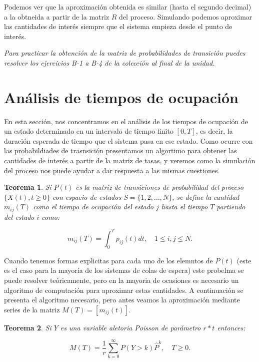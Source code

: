 \documentclass[
]{book}
\newtheorem{theorem}{Teorema}[chapter]
\theoremstyle{definition}
\theoremstyle{definition}
\theoremstyle{definition}
\theoremstyle{definition}
\theoremstyle{remark}
\begin{document}
Podemos ver que la aproximación obtenida es similar (hasta el segundo decimal) a la obtneida a partir de la matriz \(R\) del proceso. Simulando podemos aproximar las cantidades de interés siempre que el sistema empieza desde el punto de interés.

\emph{Para practicar la obtención de la matriz de probabilidades de transición puedes resolver los ejercicios B-1 a B-4 de la colección al final de la unidad.}

\hypertarget{CMTCG}{%
\section{Análisis de tiempos de ocupación}\label{CMTCG}}

En esta sección, nos concentramos en el análisis de los tiempos de ocupación de un estado determinado en un intervalo de tiempo finito \([0, T]\), es decir, la duración esperada de tiempo que el sistema pasa en ese estado. Como ocurre con las probabildiades de trasnsición presentamos un algortimo para obtener las cantidades de interés a partir de la matriz de tasas, y veremos como la simulación del proceso nos puede ayudar a dar respuesta a las mismas cuestiones.

\begin{theorem}
Si \(P(t)\) es la matriz de transiciones de probabilidad del proceso \(\{X(t), t \geq 0\}\) con espacio de estados \(S = \{1, 2,...,N\}\), se define la cantidad \(m_{ij}(T)\) como el tiempo de ocupación del estado \(j\) hasta el tiempo \(T\) partiendo del estado \(i\) como:

\[m_{ij}(T) = \int_0^T p_{ij}(t)dt, \quad 1 \leq i, j \leq N.\]
\end{theorem}

Cuando tenemos formas explicitas para cada uno de los elemntos de \(P(t)\) (este es el caso para la mayoría de los sistemas de colas de espera) este probelma se puede resolver teóricamente, pero en la mayoria de ocasiones es necesario un algoritmo de computación para aproximar estas cantidades. A continuación se presenta el algoritmo necesario, pero antes veamos la aproximación mediante series de la matriz \(M(T) = [m_{ij}(t)]\).

\begin{theorem}
Si \(Y\) es una variable aletoria Poisson de parámetro \(r*t\) entonces:

\[M(T) = \frac{1}{r} \sum_{k = 0}^{\infty} P(Y > k) \hat{P}^k, \quad T \geq 0.\]
\end{theorem}
\end{document}
